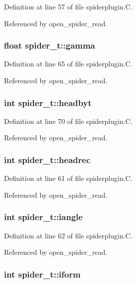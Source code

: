 Definition at line 57 of file spiderplugin.C.

Referenced by open\_\-spider\_\-read.
\subsubsection{\setlength{\rightskip}{0pt plus 5cm}float spider\_\-t::gamma}\label{structspider__t_m18}




Definition at line 65 of file spiderplugin.C.

Referenced by open\_\-spider\_\-read.
\subsubsection{\setlength{\rightskip}{0pt plus 5cm}int spider\_\-t::headbyt}\label{structspider__t_m23}




Definition at line 70 of file spiderplugin.C.

Referenced by open\_\-spider\_\-read.
\subsubsection{\setlength{\rightskip}{0pt plus 5cm}int spider\_\-t::headrec}\label{structspider__t_m14}




Definition at line 61 of file spiderplugin.C.

Referenced by open\_\-spider\_\-read.
\subsubsection{\setlength{\rightskip}{0pt plus 5cm}int spider\_\-t::iangle}\label{structspider__t_m15}




Definition at line 62 of file spiderplugin.C.

Referenced by open\_\-spider\_\-read.
\subsubsection{\setlength{\rightskip}{0pt plus 5cm}int spider\_\-t::iform}\label{structspider__t_m7}




